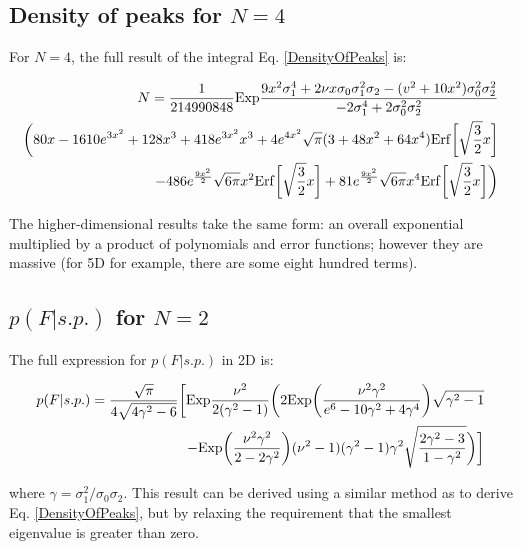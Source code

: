 \documentclass[12pt]{article}
\begin{document}
\subsection{Density of peaks for $N=4$} 
For $N=4$, the full result of the integral Eq. \ref{DensityOfPeaks} is:

\begin{equation}
\begin{split}
N = \frac{1}{214990848} \mathrm{Exp}\frac{9x^2\sigma_1^4 + 2\nu x \sigma_0 \sigma_1^2 \sigma_2 - (v^2+10x^2)\sigma_0^2\sigma_2^2}{-2\sigma_1^4+2\sigma_0^2\sigma_2^2}\\\bigg{(}80x - 1610e^{3x^2}+128x^3+418e^{3x^2}x^3+4e^{4x^2}\sqrt{\pi}(3+48x^2+64x^4)\mathrm{Erf}\bigg{[}\sqrt{\frac{3}{2}}x\bigg{]}\\
-486e^{\frac{9x^2}{2}}\sqrt{6\pi}x^2\mathrm{Erf}\bigg{[}\sqrt{\frac{3}{2}}x\bigg{]}+81e^{\frac{9x^2}{2}}\sqrt{6\pi}x^4\mathrm{Erf}\bigg{[}\sqrt{\frac{3}{2}}x\bigg{]}\bigg{)}
\end{split}
\end{equation}

The higher-dimensional results take the same form: an overall exponential multiplied by a product of polynomials and error functions; however they are massive (for 5D for example, there are some eight hundred terms).

\subsection{$p(F|s.p.)$ for $N=2$}
The full expression for $p(F|s.p.)$ in 2D is:

\begin{equation}
\begin{split}
p(F|s.p.)=\frac{\sqrt{\pi}}{4\sqrt{4\gamma^2-6}}\bigg{[}\mathrm{Exp}\frac{\nu^2}{2(\gamma^2-1)}\bigg{(}2\mathrm{Exp}\bigg{(}\frac{\nu^2\gamma^2}{e^6-10\gamma^2+4\gamma^4}\bigg{)}\sqrt{\gamma^2-1}\\
-\mathrm{Exp}\bigg{(}\frac{\nu^2\gamma^2}{2-2\gamma^2}\bigg{)}(\nu^2-1)(\gamma^2-1)\gamma^2\sqrt{\frac{2\gamma^2-3}{1-\gamma^2}}\bigg{)}\bigg{]}
\end{split}
\end{equation}

\noindent where $\gamma = \sigma_1^2/\sigma_0\sigma_2$. This result can be derived using a similar method as to derive Eq. \ref{DensityOfPeaks}, but by relaxing the requirement that the smallest eigenvalue is greater than zero.
\end{document}
